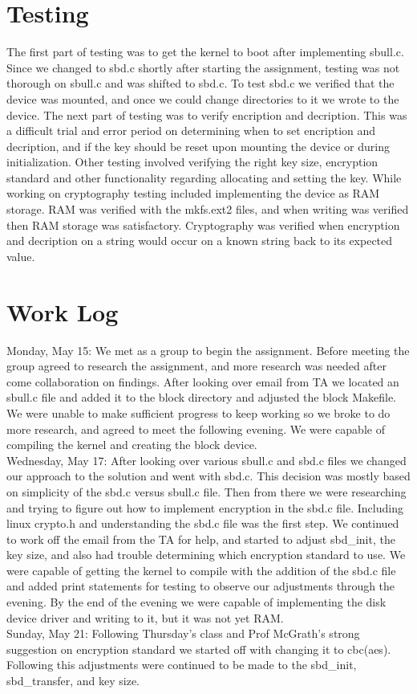 \documentclass[letterpaper,10pt,serif,draftclsnofoot,onecolumn,compsoc,titlepage]{IEEEtran}
\begin{document}
\section{Testing}
The first part of testing was to get the kernel to boot after implementing sbull.c. Since we changed to sbd.c shortly after starting the assignment, testing was not thorough on sbull.c and was shifted to sbd.c. To test sbd.c we verified that the device was mounted, and once we could change directories to it we wrote to the device. The next part of testing was to verify encription and decription. This was a difficult trial and error period on determining when to set encription and decription, and if the key should be reset upon mounting the device or during initialization. Other testing involved verifying the right key size, encryption standard and other functionality regarding allocating and setting the key. While working on cryptography testing included implementing the device as RAM storage. RAM was verified with the mkfs.ext2 files, and when writing was verified then RAM storage was satisfactory. Cryptography was verified when encryption and decription on a string would occur on a known string back to its expected value. 

\section{Work Log}
Monday, May 15: We met as a group to begin the assignment. Before meeting the group agreed to research the assignment, and more research was needed after come collaboration on findings. After looking over email from TA we located an sbull.c file and added it to the block directory and adjusted the block Makefile. We were unable to make sufficient progress to keep working so we broke to do more research, and agreed to meet the following evening. We were capable of compiling the kernel and creating the block device. \\
Wednesday, May 17: After looking over various sbull.c and sbd.c files we changed our approach to the solution and went with sbd.c. This decision was mostly based on simplicity of the sbd.c versus sbull.c file. Then from there we were researching and trying to figure out how to implement encryption in the sbd.c file. Including linux crypto.h and understanding the sbd.c file was the first step. We continued to work off the email from the TA for help, and started to adjust sbd\_init, the key size, and also had trouble determining which encryption standard to use. We were capable of getting the kernel to compile with the addition of the sbd.c file and added print statements for testing to observe our adjustments through the evening. By the end of the evening we were capable of implementing the disk device driver and writing to it, but it was not yet RAM. \\
Sunday, May 21: Following Thursday's class and Prof McGrath's strong suggestion on encryption standard we started off with changing it to cbc(aes). Following this adjustments were continued to be made to the sbd\_init, sbd\_transfer, and key size. \\
\end{document}
